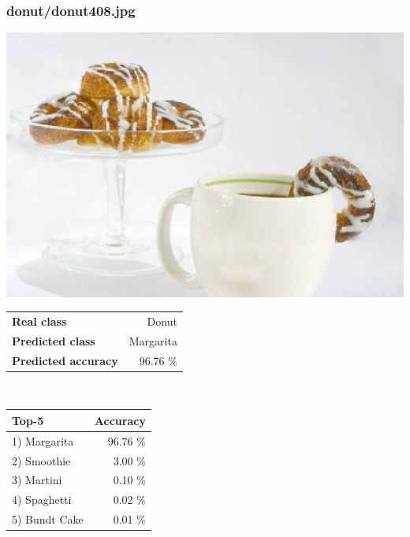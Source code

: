 \subsubsection{donut/donut408.jpg}

\begin{minipage}[t]{0.4\textwidth}
	\vspace{0pt}
	\includegraphics[width=\linewidth]{images/evaluation-images/donut/donut408.jpg}
\end{minipage}
\hfill
\begin{minipage}[t]{0.5\textwidth}
	\vspace{0pt}\raggedright
	\begin{tabularx}{\textwidth}{X r}
		\small \textbf{Real class} & \small Donut\\
		\small \textbf{Predicted class} & \small Margarita\\
		\small \textbf{Predicted accuracy} & \small 96.76 \%
    \end{tabularx}\\
    
    \vspace{6pt}
	\begin{tabularx}{\textwidth}{X r}
        \small \textbf{Top-5} & \small \textbf{Accuracy} \\
        \hline
		\small 1) Margarita & \small 96.76 \%\\\small 2) Smoothie & \small 3.00 \%\\\small 3) Martini & \small 0.10 \%\\\small 4) Spaghetti & \small 0.02 \%\\\small 5) Bundt Cake & \small 0.01 \%
    \end{tabularx}
\end{minipage}
    
